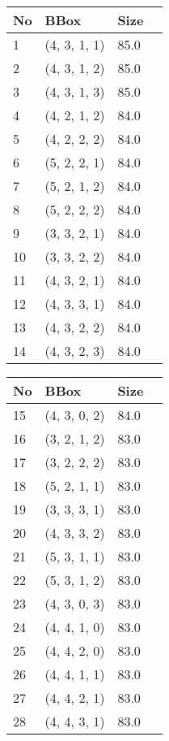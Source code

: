 %
    \begin{tabular}{|l|l|l|l|}
    \hline
    No & BBox & Size  \\
    \hline%
    
1&(4, 3, 1, 1)& 85.0\\
2&(4, 3, 1, 2)& 85.0\\
3&(4, 3, 1, 3)& 85.0\\
4&(4, 2, 1, 2)& 84.0\\
5&(4, 2, 2, 2)& 84.0\\
6&(5, 2, 2, 1)& 84.0\\
7&(5, 2, 1, 2)& 84.0\\
8&(5, 2, 2, 2)& 84.0\\
9&(3, 3, 2, 1)& 84.0\\
10&(3, 3, 2, 2)& 84.0\\
11&(4, 3, 2, 1)& 84.0\\
12&(4, 3, 3, 1)& 84.0\\
13&(4, 3, 2, 2)& 84.0\\
14&(4, 3, 2, 3)& 84.0\\
%
    \hline
    \end{tabular}%
\hspace*{5mm}
%
    \begin{tabular}{|l|l|l|l|}
    \hline
    No & BBox & Size  \\
    \hline%
    
15&(4, 3, 0, 2)& 84.0\\
16&(3, 2, 1, 2)& 83.0\\
17&(3, 2, 2, 2)& 83.0\\
18&(5, 2, 1, 1)& 83.0\\
19&(3, 3, 3, 1)& 83.0\\
20&(4, 3, 3, 2)& 83.0\\
21&(5, 3, 1, 1)& 83.0\\
22&(5, 3, 1, 2)& 83.0\\
23&(4, 3, 0, 3)& 83.0\\
24&(4, 4, 1, 0)& 83.0\\
25&(4, 4, 2, 0)& 83.0\\
26&(4, 4, 1, 1)& 83.0\\
27&(4, 4, 2, 1)& 83.0\\
28&(4, 4, 3, 1)& 83.0\\
%
    \hline
    \end{tabular}%
